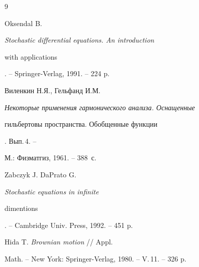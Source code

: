 \begin{thebibliography}{9}







Oksendal B. {\em Stochastic differential equations. An introduction


with applications}. -- Springer-Verlag, 1991. -- 224 p.




Виленкин Н.Я., Гельфанд И.М. 


{\em Некоторые применения гармонического анализа. Оснащенные


гильбертовы пространства. Обобщенные функции}. Вып.\,4. --


М.: Физматгиз, 1961. -- 388~с.




Zabczyk J. DaPrato G. {\em Stochastic equations in infinite


dimentions}. -- Cambridge Univ. Press, 1992. -- 451 p.




Hida T. {\em Brownian motion} // Appl.


Math. -- New York: Springer-Verlag, 1980. -- V.\,11. -- 326 p.





\end{thebibliography}





\vskip 2cm












\label{end}









